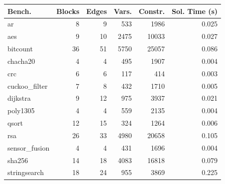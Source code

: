 \begin{tabular}{lrrrrr}
\toprule
Bench. & Blocks & Edges & Vars. & Constr. & Sol. Time (s) \\
\midrule
ar             & \num{8} & \num{9} & \num{533} & \num{1986} & \num{0.025} \\
aes            & \num{9} & \num{10} & \num{2475} & \num{10033} & \num{0.027} \\
bitcount       & \num{36} & \num{51} & \num{5750} & \num{25057} & \num{0.086} \\
chacha20       & \num{4} & \num{4} & \num{495} & \num{1907} & \num{0.004} \\
crc            & \num{6} & \num{6} & \num{117} & \num{414} & \num{0.003} \\
cuckoo\_filter & \num{7} & \num{8} & \num{432} & \num{1710} & \num{0.005} \\
dijkstra       & \num{9} & \num{12} & \num{975} & \num{3937} & \num{0.021} \\
poly1305       & \num{4} & \num{4} & \num{559} & \num{2135} & \num{0.004} \\
qsort          & \num{12} & \num{15} & \num{324} & \num{1264} & \num{0.006} \\
rsa            & \num{26} & \num{33} & \num{4980} & \num{20658} & \num{0.105} \\
sensor\_fusion & \num{4} & \num{4} & \num{431} & \num{1696} & \num{0.004} \\
sha256         & \num{14} & \num{18} & \num{4083} & \num{16818} & \num{0.079} \\
stringsearch   & \num{18} & \num{24} & \num{955} & \num{3869} & \num{0.225} \\
\bottomrule
\end{tabular}
